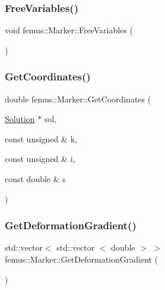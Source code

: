 \subsubsection{\texorpdfstring{Free\+Variables()}{FreeVariables()}}
{\footnotesize\ttfamily void femus\+::\+Marker\+::\+Free\+Variables (\begin{DoxyParamCaption}{ }\end{DoxyParamCaption})\hspace{0.3cm}{\ttfamily [inline]}}

\mbox{\label{classfemus_1_1_marker_a1070ae16bddb9848292c9f1bbb13fa07}} 
\subsubsection{\texorpdfstring{Get\+Coordinates()}{GetCoordinates()}}
{\footnotesize\ttfamily double femus\+::\+Marker\+::\+Get\+Coordinates (\begin{DoxyParamCaption}\item[{\mbox{\hyperlink{classfemus_1_1_solution}{Solution}} $\ast$}]{sol,  }\item[{const unsigned \&}]{k,  }\item[{const unsigned \&}]{i,  }\item[{const double \&}]{s }\end{DoxyParamCaption})\hspace{0.3cm}{\ttfamily [inline]}}

\mbox{\label{classfemus_1_1_marker_a769d6839c6c0989e6c5aaf14a41bd805}} 
\subsubsection{\texorpdfstring{Get\+Deformation\+Gradient()}{GetDeformationGradient()}}
{\footnotesize\ttfamily std\+::vector$<$ std\+::vector $<$ double $>$ $>$ femus\+::\+Marker\+::\+Get\+Deformation\+Gradient (\begin{DoxyParamCaption}{ }\end{DoxyParamCaption})\hspace{0.3cm}{\ttfamily [inline]}}

